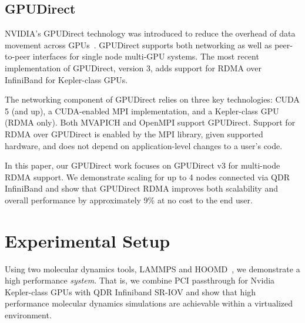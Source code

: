 \documentclass{sigplanconf}
\begin{document}
\subsection{GPUDirect}
NVIDIA's GPUDirect technology was introduced to reduce the overhead of data
movement across GPUs~\cite{GPUDirect, shainer2011development}.  GPUDirect
supports both networking as
well as peer-to-peer interfaces for single node multi-GPU systems.  The most
recent implementation of GPUDirect, version 3, adds support for RDMA over
InfiniBand for Kepler-class GPUs.

The networking component of GPUDirect relies on three key technologies: CUDA 5
(and up), a CUDA-enabled MPI implementation, and a Kepler-class GPU (RDMA only).
Both MVAPICH and OpenMPI support GPUDirect.  Support for RDMA over GPUDirect is
enabled by the MPI library, given supported hardware, and does not depend on
application-level changes to a user's code.

In this paper, our GPUDirect work focuses on GPUDirect v3 for multi-node RDMA
support.  We demonstrate scaling for up to 4 nodes connected via QDR InfiniBand
and show that GPUDirect RDMA improves both scalability and overall performance
by approximately 9\% at no cost to the end user.












\section{Experimental Setup}

Using two molecular dynamics tools, LAMMPS\cite{plimpton2007lammps} and HOOMD~\cite{anderson2010hoomd}, we demonstrate a high performance \textit{system}.  That is, we combine PCI passthrough for Nvidia Kepler-class GPUs with QDR Infiniband SR-IOV and show that high performance molecular dynamics simulations are achievable within a virtualized environment. 
\end{document}
